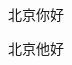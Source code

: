 \documentclass{ctexart}
\begin{document}
北京你好
\begin{comment}
这是一个例子\comment{这里是一个注释}。
\end{comment}
北京他好
\end{document}
